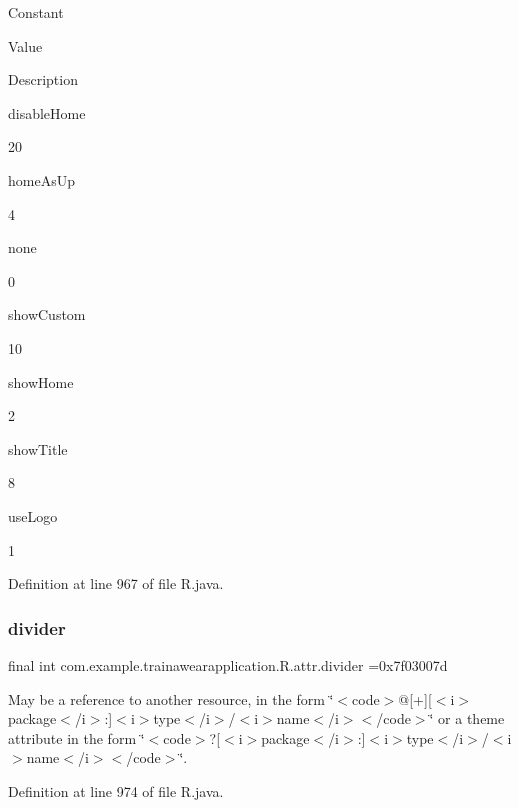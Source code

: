 Constant

Value

Description 

disable\+Home

20

home\+As\+Up

4

none

0

show\+Custom

10

show\+Home

2

show\+Title

8

use\+Logo

1

Definition at line 967 of file R.\+java.

\mbox{\label{classcom_1_1example_1_1trainawearapplication_1_1_r_1_1attr_af1ca6a71ab67ffe69064f73c4a408a07}} 
\subsubsection{\texorpdfstring{divider}{divider}}
{\footnotesize\ttfamily final int com.\+example.\+trainawearapplication.\+R.\+attr.\+divider =0x7f03007d\hspace{0.3cm}{\ttfamily [static]}}

May be a reference to another resource, in the form \char`\"{}$<$code$>$@\mbox{[}+\mbox{]}\mbox{[}$<$i$>$package$<$/i$>$\+:\mbox{]}$<$i$>$type$<$/i$>$/$<$i$>$name$<$/i$>$$<$/code$>$\char`\"{} or a theme attribute in the form \char`\"{}$<$code$>$?\mbox{[}$<$i$>$package$<$/i$>$\+:\mbox{]}$<$i$>$type$<$/i$>$/$<$i$>$name$<$/i$>$$<$/code$>$\char`\"{}. 

Definition at line 974 of file R.\+java.

\mbox{\label{classcom_1_1example_1_1trainawearapplication_1_1_r_1_1attr_a1506de43173442907927fbff59d1cbc2}} 
